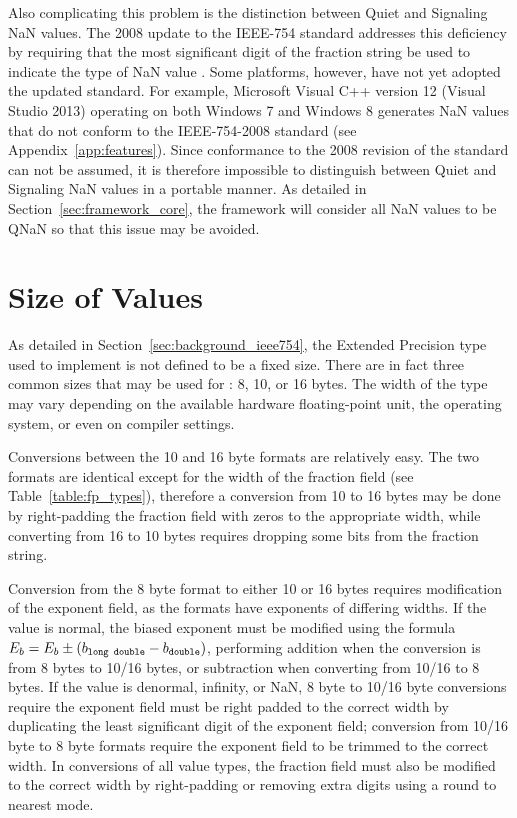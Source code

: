 Also complicating this problem is the distinction between Quiet and Signaling NaN values. The 2008 update to the IEEE-754 standard addresses this deficiency by requiring that the most significant digit of the fraction string be used to indicate the type of NaN value \cite{IEEE-754-2008}. Some platforms, however, have not yet adopted the updated standard. For example, Microsoft Visual C++ version 12 (Visual Studio 2013) operating on both Windows 7 and Windows 8 generates NaN values that do not conform to the IEEE-754-2008 standard (see Appendix~\ref{app:features}). Since conformance to the 2008 revision of the standard can not be assumed, it is therefore impossible to distinguish between Quiet and Signaling NaN values in a portable manner. As detailed in Section~\ref{sec:framework_core}, the framework will consider all NaN values to be QNaN so that this issue may be avoided.

\section{Size of  Values}
\label{sec:challenges_ld_size}
As detailed in Section~\ref{sec:background_ieee754}, the Extended Precision type used to implement  is not defined to be a fixed size. There are in fact three common sizes that may be used for : 8, 10, or 16 bytes. The width of the  type may vary depending on the available hardware floating-point unit, the operating system, or even on compiler settings.

Conversions between the 10 and 16 byte formats are relatively easy. The two formats are identical except for the width of the fraction field (see Table~\ref{table:fp_types}), therefore a conversion from 10 to 16 bytes may be done by right-padding the fraction field with zeros to the appropriate width, while converting from 16 to 10 bytes requires dropping some bits from the fraction string.

Conversion from the 8 byte format to either 10 or 16 bytes requires modification of the exponent field, as the formats have exponents of differing widths. If the value is normal, the biased exponent must be modified using the formula $E_{b} = E_{b} \pm (b_{\texttt{long double}} - b_{\texttt{double}})$, performing addition when the conversion is from 8 bytes to 10/16 bytes, or subtraction when converting from 10/16 to 8 bytes. If the value is denormal, infinity, or NaN, 8 byte to 10/16 byte conversions require the exponent field must be right padded to the correct width by duplicating the least significant digit of the exponent field; conversion from 10/16 byte to 8 byte formats require the exponent field to be trimmed to the correct width. In conversions of all value types, the fraction field must also be modified to the correct width by right-padding or removing extra digits using a round to nearest mode.

